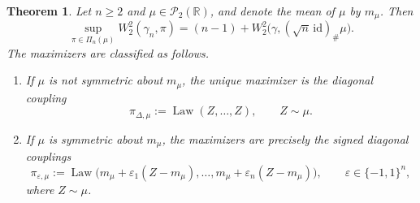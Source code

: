 \documentclass[10pt,a4paper]{amsart}
\newtheorem{theorem}{Theorem}
\newcommand{\Law}{\operatorname{Law}}
\newcommand{\Pcal}{\mathcal{P}}
\newcommand{\R}{\mathbb{R}}
\newcommand{\W}{W}
\begin{document}
\begin{theorem}\label{thm:general}
Let $n\geq2$ and $\mu\in\Pcal_2(\R)$, and denote the mean of $\mu$ by
$m_\mu$. Then
\begin{equation}\label{eq:general-value}
  \sup_{\pi\in\Pi_n(\mu)}
  \W_2^2(\gamma_n,\pi)
  =
  (n-1)
  +
  \W_2^2\bigl(\gamma,(\sqrt n\,\mathrm{id})_\#\mu\bigr).
\end{equation}
The maximizers are classified as follows.
\begin{enumerate}[label=\textup{(\roman*)}]
  \item If $\mu$ is not symmetric about $m_\mu$, the unique maximizer is
  the diagonal coupling
  \[
    \pi_{\Delta,\mu}
    :=
    \Law(Z,\ldots,Z),
    \qquad Z\sim\mu.
  \]

  \item If $\mu$ is symmetric about $m_\mu$, the maximizers are precisely
  the signed diagonal couplings
  \begin{equation}\label{eq:signed-mu-diagonals}
    \pi_{\varepsilon,\mu}
    :=
    \Law\bigl(
      m_\mu+\varepsilon_1(Z-m_\mu),\ldots,
      m_\mu+\varepsilon_n(Z-m_\mu)
    \bigr),
    \qquad
    \varepsilon\in\{-1,1\}^n,
  \end{equation}
  where $Z\sim\mu$.
\end{enumerate}
\end{theorem}
\end{document}

